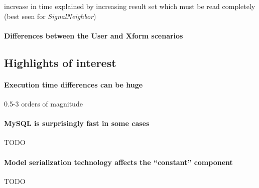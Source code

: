 increase in time explained by increasing result set which must be read completely
(best seen for \emph{SignalNeighbor})

 
 

\paragraph{Differences between the User and Xform scenarios}

\subsection{Highlights of interest}

\paragraph{Execution time differences can be huge}
0.5-3 orders of magnitude

\paragraph{MySQL is surprisingly fast in some cases}
TODO

\paragraph{Model serialization technology affects the ``constant'' component}
TODO

